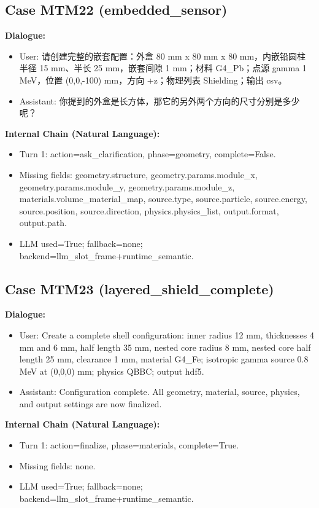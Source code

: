 \documentclass[11pt]{ctexart}
\begin{document}
\subsection{Case MTM22 (embedded\_sensor)}
\textbf{Dialogue:}
\begin{itemize}
\item User: 请创建完整的嵌套配置：外盒 80 mm x 80 mm x 80 mm，内嵌铅圆柱半径 15 mm、半长 25 mm，嵌套间隙 1 mm；材料 G4\_Pb；点源 gamma 1 MeV，位置 (0,0,-100) mm，方向 +z；物理列表 Shielding；输出 csv。
\item Assistant: 你提到的外盒是长方体，那它的另外两个方向的尺寸分别是多少呢？
\end{itemize}
\textbf{Internal Chain (Natural Language):}
\begin{itemize}
\item Turn 1: action=ask\_clarification, phase=geometry, complete=False.
\item Missing fields: geometry.structure, geometry.params.module\_x, geometry.params.module\_y, geometry.params.module\_z, materials.volume\_material\_map, source.type, source.particle, source.energy, source.position, source.direction, physics.physics\_list, output.format, output.path.
\item LLM used=True; fallback=none; backend=llm\_slot\_frame+runtime\_semantic.
\end{itemize}
\subsection{Case MTM23 (layered\_shield\_complete)}
\textbf{Dialogue:}
\begin{itemize}
\item User: Create a complete shell configuration: inner radius 12 mm, thicknesses 4 mm and 6 mm, half length 35 mm, nested core radius 8 mm, nested core half length 25 mm, clearance 1 mm, material G4\_Fe; isotropic gamma source 0.8 MeV at (0,0,0) mm; physics QBBC; output hdf5.
\item Assistant: Configuration complete. All geometry, material, source, physics, and output settings are now finalized.
\end{itemize}
\textbf{Internal Chain (Natural Language):}
\begin{itemize}
\item Turn 1: action=finalize, phase=materials, complete=True.
\item Missing fields: none.
\item LLM used=True; fallback=none; backend=llm\_slot\_frame+runtime\_semantic.
\end{itemize}
\end{document}
